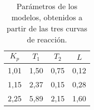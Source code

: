 \begin{SCtable}
\caption[Parámetros de los modelos]{Parámetros de los modelos, obtenidos a partir de las tres curvas de reacción.} \label{tab:01}
    \begin{tabular}{@{}*{4}{c}@{}}
    \toprule
    $K_p$ & $T_1$ & $T_2$ & $L$ \\
    \midrule
     1,01 & 1,50 & 0,75 & 0,12 \\
		 1,15 & 2,37 & 0,15 & 0,28 \\
		 2,25 & 5,89 & 2,15 & 1,60 \\
    \bottomrule
    \end{tabular}
\end{SCtable}